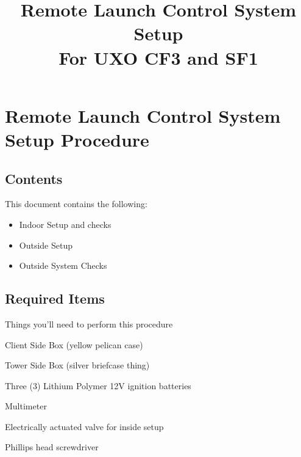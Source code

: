 

\title{
\Huge Remote Launch Control System Setup\\
\vspace{1cm}
\Large For UXO CF3 and SF1}








\section{Remote Launch Control System Setup Procedure}


\subsection{Contents}
This document contains the following:
\begin{itemize}
    \item Indoor Setup and checks
    \item Outside Setup
    \item Outside System Checks
\end{itemize}

\subsection{Required Items}
Things you'll need to perform this procedure
\begin{checklist}
    \item Client Side Box (yellow pelican case)
    \item Tower Side Box (silver briefcase thing)
    \item Three (3) Lithium Polymer 12V ignition batteries
    \item Multimeter
    \item Electrically actuated valve for inside setup
    \item Phillips head screwdriver
\end{checklist}

